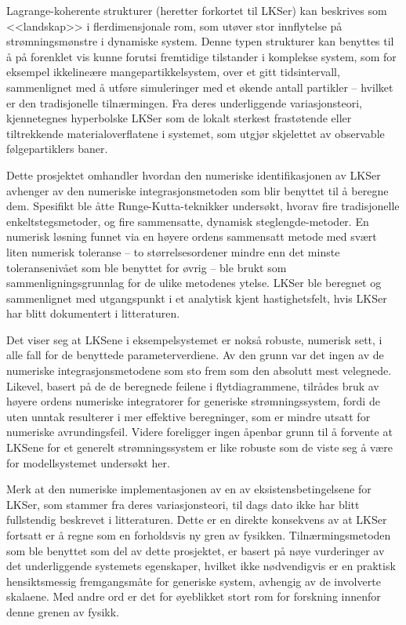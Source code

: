 Lagrange-koherente strukturer (heretter forkortet til LKSer) kan beskrives som
<<landskap>> i flerdimensjonale rom, som utøver stor innflytelse på
strømningsmønstre i dynamiske system. Denne typen strukturer kan benyttes til
å på forenklet vis kunne forutsi fremtidige tilstander i komplekse system, som
for eksempel ikkelineære mangepartikkelsystem, over et gitt tidsintervall,
sammenlignet med å utføre simuleringer med et økende antall partikler --
hvilket er den tradisjonelle tilnærmingen. Fra deres underliggende
variasjonsteori, kjennetegnes hyperbolske LKSer som de lokalt sterkest
frastøtende eller tiltrekkende materialoverflatene i systemet, som utgjør
skjelettet av observable følgepartiklers baner.

Dette prosjektet omhandler hvordan den numeriske identifikasjonen av LKSer
avhenger av den numeriske integrasjonsmetoden som blir benyttet til å beregne
dem. Spesifikt ble åtte Runge-Kutta-teknikker undersøkt, hvorav fire
tradisjonelle enkeltstegsmetoder, og fire sammensatte,
dynamisk steglengde-metoder. En numerisk løsning funnet via en høyere
ordens sammensatt metode med svært liten numerisk toleranse -- to
størrelsesordener mindre enn det minste toleransenivået som ble benyttet for
øvrig -- ble brukt som sammenligningsgrunnlag for de ulike metodenes ytelse.
LKSer ble beregnet og sammenlignet med utgangspunkt i et analytisk kjent
hastighetsfelt, hvis LKSer har blitt dokumentert i litteraturen.

Det viser seg at LKSene i eksempelsystemet er nokså robuste, numerisk sett,
i alle fall for de benyttede parameterverdiene. Av den grunn var det ingen
av de numeriske integrasjonsmetodene som sto frem som den absolutt mest
velegnede. Likevel, basert på de de beregnede feilene i flytdiagrammene,
tilrådes bruk av høyere ordens numeriske integratorer for generiske
strømningssystem, fordi de uten unntak resulterer i mer effektive beregninger,
som er mindre utsatt for numeriske avrundingsfeil. Videre foreligger ingen
åpenbar grunn til å forvente at LKSene for et generelt strømningssystem er like
robuste som de viste seg å være for modellsystemet undersøkt her.

Merk at den numeriske implementasjonen av en av eksistensbetingelsene for
LKSer, som stammer fra deres variasjonsteori, til dags dato ikke har blitt
fullstendig beskrevet i litteraturen. Dette er en direkte konsekvens
av at LKSer fortsatt er å regne som en forholdsvis ny gren av fysikken.
Tilnærmingsmetoden som ble benyttet som del av dette prosjektet, er basert
på nøye vurderinger av det underliggende systemets egenskaper, hvilket
ikke nødvendigvis er en praktisk hensiktsmessig fremgangsmåte for generiske
system, avhengig av de involverte skalaene. Med andre ord er det for øyeblikket
stort rom for forskning innenfor denne grenen av fysikk.

